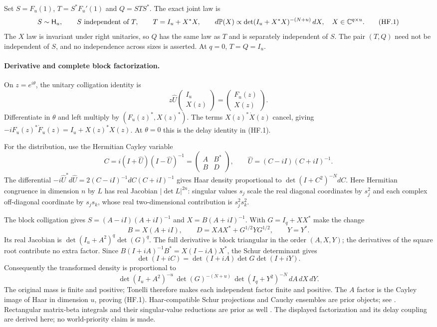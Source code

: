 Set $S=F_u(1)$, $T=S^*F_u'(1)$ and $Q=STS^*$.
The exact joint law is
\[
 S\sim\mathsf H_u,\qquad S\ \hbox{independent of }T,\qquad
 T=I_u+X^*X,\qquad
 d\mathbb P(X)\propto\det(I_u+X^*X)^{-(N+u)}\,dX ,
 \quad X\in\mathbb C^{q\times u}.                         \tag{HF.1}
\]
The $X$ law is invariant under right unitaries, so $Q$ has the same law
as $T$ and is separately independent of $S$. The pair $(T,Q)$ need not
be independent of $S$, and no independence across sizes is asserted.
At $q=0$, $T=Q=I_u$.

\paragraph{Derivative and complete block factorization.}
On $z=e^{i\theta}$, the unitary colligation identity is
\[
 z\widehat U\begin{pmatrix}I_u\\X(z)\end{pmatrix}
       =\begin{pmatrix}F_u(z)\\X(z)\end{pmatrix}.
\]
Differentiate in $\theta$ and left multiply by $(F_u(z)^*,X(z)^*)$.
The terms $X(z)^*\dot X(z)$ cancel, giving
$-iF_u(z)^*\dot F_u(z)=I_u+X(z)^*X(z)$. At $\theta=0$ this is the
delay identity in (HF.1).

For the distribution, use the Hermitian Cayley variable
\[
 C=i(I+\widehat U)(I-\widehat U)^{-1}
      =\begin{pmatrix}A&B^*\\B&D\end{pmatrix},\qquad
 \widehat U=(C-iI)(C+iI)^{-1}.
\]
The differential
$-i\widehat U^*d\widehat U=2(C-iI)^{-1}dC(C+iI)^{-1}$ gives Haar
density proportional to $\det(I+C^2)^{-N}dC$. Here Hermitian
congruence in dimension $n$ by $L$ has real Jacobian
$|\det L|^{2n}$: singular values $s_j$ scale the real diagonal
coordinates by $s_j^2$ and each complex off-diagonal coordinate by
$s_js_k$, whose real two-dimensional contribution is $s_j^2s_k^2$.

The block colligation gives $S=(A-iI)(A+iI)^{-1}$ and
$X=B(A+iI)^{-1}$. With $G=I_q+XX^*$ make the change
\[
 B=X(A+iI),\qquad D=XAX^*+G^{1/2}YG^{1/2},\qquad Y=Y^* .
\]
Its real Jacobian is $\det(I_u+A^2)^q\det(G)^q$.
The full derivative is block triangular in the order $(A,X,Y)$;
the derivatives of the square root contribute no extra factor.
Since
$B(I+iA)^{-1}B^*=X(I-iA)X^*$, the Schur determinant gives
\[
 \det(I+iC)=\det(I+iA)\det G\det(I+iY).
\]
Consequently the transformed density is proportional to
\[
 \det(I_u+A^2)^{-u}\,
 \det(G)^{-(N+u)}\,
 \det(I_q+Y^2)^{-N}\,dA\,dX\,dY.                     \tag{HF.2}
\]
The original mass is finite and positive; Tonelli therefore makes
each independent factor finite and positive. The $A$ factor is the
Cayley image of Haar in dimension $u$, proving (HF.1).
Haar-compatible Schur projections and Cauchy ensembles are prior
objects; see \cite{BNN2011Haar}. Rectangular matrix-beta integrals and
their singular-value reductions are prior as well
\cite{Neretin2015Beta}. The displayed factorization and its delay
coupling are derived here; no world-priority claim is made.


